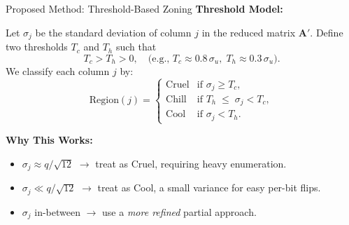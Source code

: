 \documentclass{beamer}
\begin{document}
\begin{frame}{Proposed Method: Threshold-Based Zoning}
\textbf{Threshold Model:}

Let $\sigma_j$ be the standard deviation of column $j$ in the reduced matrix $\mathbf{A}'$.
Define two thresholds $T_c$ and $T_h$ such that
\[
  T_c > T_h > 0, \quad \text{(e.g., }T_c \approx 0.8\,\sigma_u,\; T_h \approx 0.3\,\sigma_u\text{).}
\]
We classify each column $j$ by:
\[
  \text{Region}(j) =
  \begin{cases}
    \mathrm{Cruel} & \text{if } \sigma_j \ge T_c, \\
    \mathrm{Chill} & \text{if } T_h \;\le\;\sigma_j < T_c, \\
    \mathrm{Cool}  & \text{if } \sigma_j < T_h.
  \end{cases}
\]

\textbf{Why This Works:}
\begin{itemize}
  \item \(\sigma_j \approx q/\sqrt{12}\) $\rightarrow$ treat as Cruel, requiring heavy enumeration.
  \item \(\sigma_j \ll q/\sqrt{12}\) $\rightarrow$ treat as Cool, a small variance for easy per-bit flips.
  \item \(\sigma_j\) in-between $\rightarrow$ use a \emph{more refined} partial approach.
\end{itemize}
\end{frame}
\end{document}
